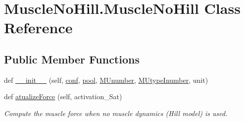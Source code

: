 \hypertarget{class_muscle_no_hill_1_1_muscle_no_hill}{}\section{Muscle\+No\+Hill.\+Muscle\+No\+Hill Class Reference}
\label{class_muscle_no_hill_1_1_muscle_no_hill}
\subsection*{Public Member Functions}
\begin{DoxyCompactItemize}
\item 
def \hyperlink{class_muscle_no_hill_1_1_muscle_no_hill_a5070624c6605f34e4c3829f927adaa95}{\+\_\+\+\_\+init\+\_\+\+\_\+} (self, \hyperlink{class_muscle_no_hill_1_1_muscle_no_hill_a766382d5bd77328ab5c39eec6eb163f4}{conf}, \hyperlink{class_muscle_no_hill_1_1_muscle_no_hill_a93bd043a0b802af9268873b1d2a4cc57}{pool}, \hyperlink{class_muscle_no_hill_1_1_muscle_no_hill_ae2a6a4b782c8abea0bb581b2d133f064}{M\+Unumber}, \hyperlink{class_muscle_no_hill_1_1_muscle_no_hill_ab69c47ef7b07407562fc0b9fa65bacf0}{M\+Utype\+Inumber}, unit)
\item 
def \hyperlink{class_muscle_no_hill_1_1_muscle_no_hill_abc25f980400ce3aa3a087161147da997}{atualize\+Force} (self, activation\+\_\+\+Sat)
\begin{DoxyCompactList}\small\item\em Compute the muscle force when no muscle dynamics (Hill model) is used. \end{DoxyCompactList}\end{DoxyCompactItemize}
